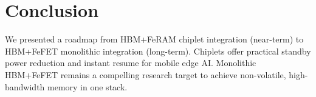 \section{Conclusion}
We presented a roadmap from HBM+FeRAM chiplet integration (near-term) to HBM+FeFET monolithic integration (long-term). 
Chiplets offer practical standby power reduction and instant resume for mobile edge AI. 
Monolithic HBM+FeFET remains a compelling research target to achieve non-volatile, high-bandwidth memory in one stack.
